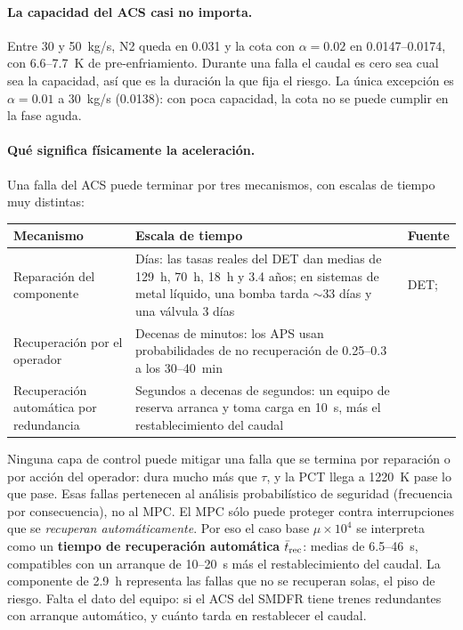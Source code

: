 \paragraph{La capacidad del ACS casi no importa.} Entre 30 y 50~kg/s, N2 queda en 0.031 y la
cota con $\alpha=0.02$ en 0.0147--0.0174, con 6.6--7.7~K de pre-enfriamiento. Durante una falla
el caudal es cero sea cual sea la capacidad, así que es la duración la que fija el riesgo. La
única excepción es $\alpha=0.01$ a 30~kg/s (0.0138): con poca capacidad, la cota no se puede
cumplir en la fase aguda.

\paragraph{Qué significa físicamente la aceleración.} Una falla del ACS puede terminar por tres
mecanismos, con escalas de tiempo muy distintas:
\begin{center}\small
\begin{tabularx}{\linewidth}{@{}l Y l@{}}\toprule
Mecanismo & Escala de tiempo & Fuente\\\midrule
Reparación del componente & Días: las tasas reales del DET dan medias de 129~h, 70~h, 18~h y 3.4 años; en sistemas de metal líquido, una bomba tarda $\sim$33 días y una válvula 3 días & DET; \cite{cadwallader}\\
Recuperación por el operador & Decenas de minutos: los APS usan probabilidades de no recuperación de 0.25--0.3 a los 30--40~min & \cite{nrcgi122}\\
Recuperación automática por redundancia & Segundos a decenas de segundos: un equipo de reserva arranca y toma carga en 10~s, más el restablecimiento del caudal & \cite{nfpa110}\\\bottomrule
\end{tabularx}
\end{center}
Ninguna capa de control puede mitigar una falla que se termina por reparación o por acción del
operador: dura mucho más que $\tau$, y la PCT llega a 1220~K pase lo que pase. Esas fallas
pertenecen al análisis probabilístico de seguridad (frecuencia por consecuencia), no al MPC. El
MPC sólo puede proteger contra interrupciones que se \emph{recuperan automáticamente}. Por eso
el caso base $\mu\times10^4$ se interpreta como un \textbf{tiempo de recuperación automática}
$\bar t_{\rm rec}$: medias de 6.5--46~s, compatibles con un arranque de 10--20~s más el
restablecimiento del caudal. La componente de 2.9~h representa las fallas que no se recuperan
solas, el piso de riesgo. Falta el dato del equipo: si el ACS del SMDFR tiene trenes redundantes
con arranque automático, y cuánto tarda en restablecer el caudal.

